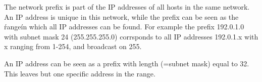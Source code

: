 The network prefix is part of the IP addresses of all hosts in the same network.
An IP address is unique in this network, while the prefix can be seen as the \'range\' in which all IP addresses can be found. 
For example the prefix 192.0.1.0 with subnet mask 24 (255.255.255.0) corrsponds to all IP addresses 192.0.1.x with x ranging from 1-254, and broadcast on 255.

An IP address can be seen as a prefix with length (=subnet mask) equal to 32. This leaves but one specific address in the range.
